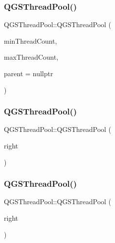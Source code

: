 \subsubsection{\texorpdfstring{Q\+G\+S\+Thread\+Pool()}{QGSThreadPool()}\hspace{0.1cm}{\footnotesize\ttfamily [1/3]}}
{\footnotesize\ttfamily Q\+G\+S\+Thread\+Pool\+::\+Q\+G\+S\+Thread\+Pool (\begin{DoxyParamCaption}\item[{const int}]{min\+Thread\+Count,  }\item[{const int}]{max\+Thread\+Count,  }\item[{Q\+Object $\ast$}]{parent = {\ttfamily nullptr} }\end{DoxyParamCaption})}

\mbox{\label{class_q_g_s_thread_pool_a80b24826f940decd2e16b111288a11b9}} 
\subsubsection{\texorpdfstring{Q\+G\+S\+Thread\+Pool()}{QGSThreadPool()}\hspace{0.1cm}{\footnotesize\ttfamily [2/3]}}
{\footnotesize\ttfamily Q\+G\+S\+Thread\+Pool\+::\+Q\+G\+S\+Thread\+Pool (\begin{DoxyParamCaption}\item[{const \mbox{\hyperlink{class_q_g_s_thread_pool}{Q\+G\+S\+Thread\+Pool}} \&}]{right }\end{DoxyParamCaption})\hspace{0.3cm}{\ttfamily [delete]}}

\mbox{\label{class_q_g_s_thread_pool_a5fc9ad5ad1dce6d4b15a1b90b957dee2}} 
\subsubsection{\texorpdfstring{Q\+G\+S\+Thread\+Pool()}{QGSThreadPool()}\hspace{0.1cm}{\footnotesize\ttfamily [3/3]}}
{\footnotesize\ttfamily Q\+G\+S\+Thread\+Pool\+::\+Q\+G\+S\+Thread\+Pool (\begin{DoxyParamCaption}\item[{\mbox{\hyperlink{class_q_g_s_thread_pool}{Q\+G\+S\+Thread\+Pool}} \&\&}]{right }\end{DoxyParamCaption})\hspace{0.3cm}{\ttfamily [delete]}}


